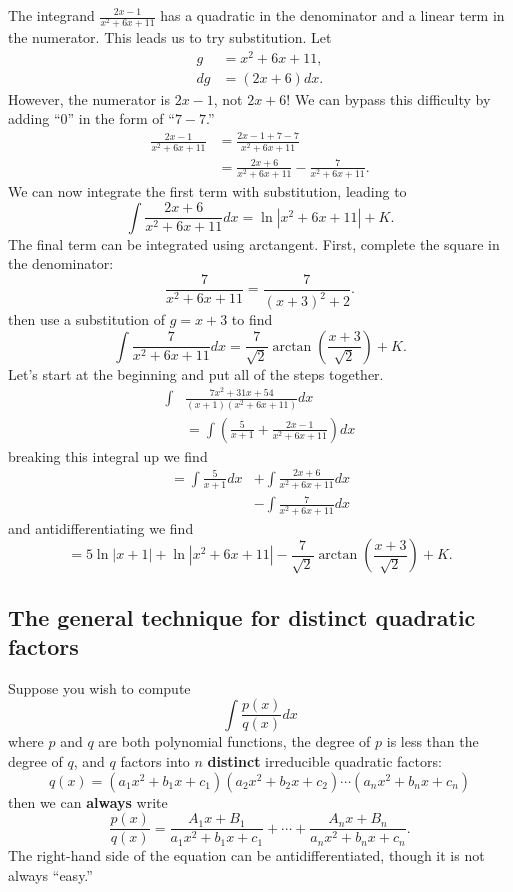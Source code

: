 \documentclass{ximera}
\begin{document}
\begin{example}
\begin{explanation}
    The integrand $\frac{2x-1}{x^2+6x+11}$ has a quadratic in the
    denominator and a linear term in the numerator. This leads us to
    try substitution. Let
    \begin{align*}
      g &= x^2+6x+11,\\
      dg  &= (2x+6)dx.
    \end{align*}
    However, the numerator is $2x-1$, not $2x+6$! We can bypass this
    difficulty by adding ``$0$'' in the form of ``$7-7$.''
\begin{align*}
  \frac{2x-1}{x^2+6x+11} &= \frac{2x-1+7-7}{x^2+6x+11} \\
  &= \frac{2x+6}{x^2+6x+11} - \frac{7}{x^2+6x+11}.
\end{align*}
We can now integrate the first term with substitution, leading to
\[
\int \frac{2x+6}{x^2+6x+11} dx = \ln|x^2+6x+11| + K.
\]
The final term can be integrated using arctangent. First, complete the
square in the denominator:
\[
\frac{7}{x^2+6x+11} = \frac{7}{(x+3)^2+2}.
\]
then use a substitution of $g = x+3$ to find
\[
\int \frac{7}{x^2+6x+11}dx = \frac{7}{\sqrt{2}}\arctan\left(\frac{x+3}{\sqrt{2}}\right)+K.
\]
Let's start at the beginning and put all of the steps together.
\begin{align*}
  \int&\frac{7x^2+31x+54}{(x+1)(x^2+6x+11)}dx \\
  &= \int\left(\frac{5}{x+1} + \frac{2x-1}{x^2+6x+11}\right)dx
\end{align*}
breaking this integral up we find
\begin{align*}
  = \int\frac{5}{x+1}dx  &+ \int\frac{2x+6}{x^2+6x+11}dx\\
  &-\int\frac{7}{x^2+6x+11}dx
\end{align*}
and antidifferentiating we find
\[
  = 5\ln|x+1|+ \ln|x^2+6x+11|-\frac{7}{\sqrt{2}}\arctan\left(\frac{x+3}{\sqrt{2}}\right)+K.
\]
  \end{explanation}
\end{example}


\subsection{The general technique for distinct quadratic factors}

Suppose you wish to compute
\[
\int \frac{p(x)}{q(x)} dx
\]
where $p$ and $q$ are both polynomial functions, the degree of $p$ is
less than the degree of $q$, and $q$ factors into $n$
\textbf{distinct} irreducible quadratic factors:
\[
q(x) = (a_1x^2 + b_1 x + c_1) (a_2x^2 + b_2 x + c_2)\cdots  (a_nx^2 + b_n x + c_n) 
\]
then we can \textbf{always} write
\[
\frac{p(x)}{q(x)}  = \frac{A_1x+B_1}{a_1x^2 + b_1 x + c_1} + \cdots + \frac{A_nx+B_n}{a_nx^2 + b_n x + c_n}. 
\]
The right-hand side of the equation can be antidifferentiated, though it is not always ``easy.''
\end{document}
